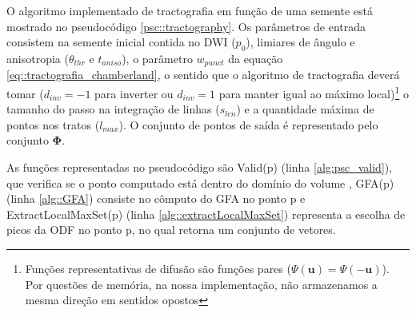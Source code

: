 \documentclass[
    12pt,                %
    oneside,            %
    a4paper,            %
    english,            %
    french,                %
    spanish,            %
    brazil                %
    ]{abntex2}
\begin{document}
O algoritmo implementado de tractografia em função de uma semente está mostrado no pseudocódigo \ref{psc::tractography}. Os parâmetros de entrada consistem na semente inicial contida no DWI ($p_0$), limiares de ângulo e anisotropia ($\theta_{thr}$ e $t_{aniso}$), o parâmetro $w_{punct}$ da equação \ref{eq::tractografia_chamberland}, o sentido que o algoritmo de tractografia deverá tomar ($d_{inv} = -1$ para inverter ou $d_{inv} = 1$ para manter igual ao máximo local)\footnote{Funções representativas de difusão são funções pares ($\Psi(\mathbf{u}) = \Psi(\mathbf{-u})$). Por questões de memória, na nossa implementação, não armazenamos a mesma direção em sentidos opostos}  o tamanho do passo na integração de linhas ($s_{len}$) e a quantidade máxima de pontos nos tratos ($l_{max}$). O conjunto de pontos de saída é representado pelo conjunto $\mathbf{\Phi}$.


As funções representadas no pseudocódigo são Valid(p) (linha \ref{alg:psc_valid}), que verifica se o ponto computado está dentro do domínio do volume , GFA(p) (linha \ref{alg::GFA}) consiste no cômputo do GFA no ponto p e ExtractLocalMaxSet(p) (linha \ref{alg::extractLocalMaxSet}) representa a escolha de picos da ODF no ponto p, no qual retorna um conjunto de vetores.




\end{document}
